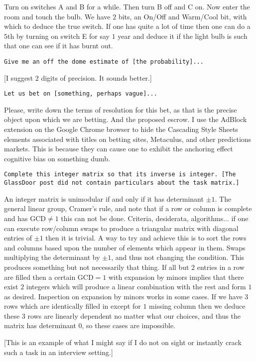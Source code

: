 Turn on switches A and B for a while. Then turn B off and C on. Now enter the room and touch the bulb. We have $2$ bits, an On/Off and Warm/Cool bit, with which to deduce the true switch. If one has quite a lot of time then one can do a $5$th by turning on switch E for say $1$ year and deduce it if the light bulb is such that one can see if it has burnt out.

\texttt{Give me an off the dome estimate of [the probability]...}

[I suggest $2$ digits of precision. It sounds better.]

\texttt{Let us bet on [something, perhaps vague]...}

Please, write down the terms of resolution for this bet, as that is the precise object upon which we are betting. And the proposed escrow. I use the AdBlock extension on the Google Chrome browser to hide the Cascading Style Sheets elements associated with titles on betting sites, Metaculus, and other predictions markets. This is because they can cause one to exhibit the anchoring effect cognitive bias on something dumb.

\texttt{Complete this integer matrix so that its inverse is integer. [The GlassDoor post did not contain particulars about the task matrix.]}

An integer matrix is unimodular if and only if it has determinant $\pm 1$. The general linear group, Cramer's rule, and note that if a row or column is complete and has $\text{GCD} \neq 1$ this can not be done. Criteria, desiderata, algorithms... if one can execute row/column swaps to produce a triangular matrix with diagonal entries of $\pm 1$ then it is trivial. A way to try and achieve this is to sort the rows and columns based upon the number of elements which appear in them. Swaps multiplying the determinant by $\pm 1$, and thus not changing the condition. This produces something but not necessarily that thing. If all but $2$ entries in a row are filled then a certain $\text{GCD} = 1$ with expansion by minors implies that there exist $2$ integers which will produce a linear combination with the rest and form $1$ as desired. Inspection on expansion by minors works in some cases. If we have $3$ rows which are identically filled in except for $1$ missing column then we deduce these $3$ rows are linearly dependent no matter what our choices, and thus the matrix has determinant $0$, so these cases are impossible.

[This is an example of what I might say if I do not on sight or instantly crack such a task in an interview setting.]

